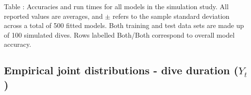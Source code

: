 \documentclass{article}
\begin{document}
        \noindent Table : Accuracies and run times for all models in the simulation study. All reported values are averages, and $\pm$ refers to the sample standard deviation across a total of 500 fitted models. Both training and test data sets are made up of 100 simulated dives. Rows labelled Both/Both correspond to overall model accuracy.
        \addtocounter{tablenum}{1}

    \newpage
    \subsection{Empirical joint distributions - dive duration ($Y_t$)}

        \begin{center}
\end{center}
\end{document}

